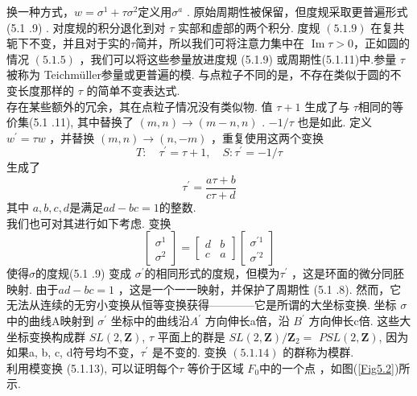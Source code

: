 换一种方式，$w=\sigma^{1}+\tau \sigma^{2}$定义用$\sigma^{a}$ . 原始周期性被保留，但度规采取更普遍形式  (5.1 .9) . 对度规的积分退化到对 $\tau $ 实部和虚部的两个积分. 度规 $(5.1 .9)$ 在复共轭下不变，并且对于实的$\tau$简并，所以我们可将注意力集中在  $\operatorname{Im} \tau>0 $，正如圆的情况 $(5.1 .5)$ ，我们可以将这些参量放进度规 (5.1.9) 或周期性(5.1.11)中.参量 $\tau$ 被称为 Teichmüller参量或更普遍的模. 与点粒子不同的是，不存在类似于圆的不变长度那样的 $\tau$ 的简单不变表达式.\\
存在某些额外的冗余，其在点粒子情况没有类似物. 值 $\tau+1$ 生成了与 $\tau$相同的等价集(5.1 .11), 其中替换了 $(m, n) \rightarrow(m-n, n) $ .  $-1 / \tau$ 也是如此. 定义 $w^{\prime}=\tau w$ ，并替换 $(m, n) \rightarrow(n,-m) $ ，重复使用这两个变换
\begin{equation}
	T: \quad \tau^{\prime}=\tau+1, \quad S: \tau^{\prime}=-1 / \tau
\end{equation}
生成了
\begin{equation}
	\tau^{\prime}=\frac{a \tau+b}{c \tau+d}
\end{equation}
其中 $a, b, c, d$是满足$a d-b c=1$的整数.\\
我们也可对其进行如下考虑. 变换
\begin{equation}
	\left[\begin{array}{l}
		\sigma^{1} \\
		\sigma^{2}
	\end{array}\right]=\left[\begin{array}{ll}
		d & b \\
		c & a
	\end{array}\right]\left[\begin{array}{l}
		\sigma^{\prime 1} \\
		\sigma^{\prime 2}
	\end{array}\right]
\end{equation}
使得$\sigma$的度规(5.1 .9) 变成 $\sigma^{\prime}$的相同形式的度规，但模为$\tau^{\prime} $ ，这是环面的微分同胚映射. 由于$a d-b c=1$ ，这是一个一一映射，并保护了周期性 (5.1 .8). 然而，它无法从连续的无穷小变换从恒等变换获得————它是所谓的大坐标变换. 坐标 $\sigma$ 中的曲线A映射到 $\sigma^{\prime}$ 坐标中的曲线沿$A^{\prime}$ 方向伸长a倍，沿 $B^{\prime}$ 方向伸长c倍. 这些大坐标变换构成群 $S L(2, \mathbf{Z})$,  $\tau$ 平面上的群是 $S L(2, \mathbf{Z}) / \mathbf{Z}_{2}=$ $P S L(2, \mathbf{Z})$, 因为如果a, b, c, d符号均不变，$\tau^{\prime}$ 是不变的. 变换 $(5.1 .14)$ 的群称为模群.\\
利用模变换 (5.1.13), 可以证明每个$\tau$ 等价于区域 $F_{0}$中的一个点 ，如图(\ref{Fig5.2})所示.

